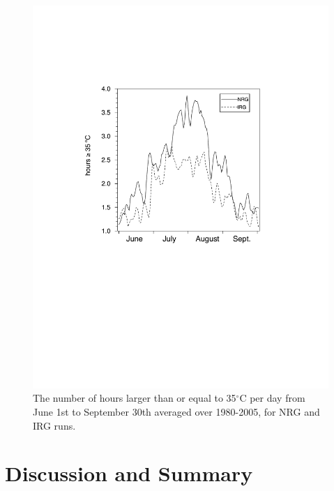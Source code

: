 \begin{figure}
\begin{center}
\includegraphics[width=6in]{irrig_hours_T2>=35.pdf}
\caption{The number of hours larger than or equal to 35$^\circ$C per day from June 1st to September 30th averaged over 1980-2005, for NRG and IRG runs.}
\label{fig:Figure 6}
\end{center}
\end{figure}


\section{Discussion and Summary}

